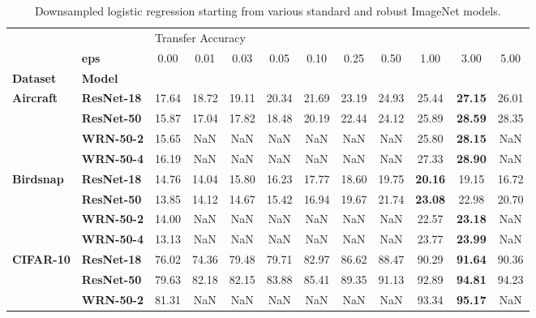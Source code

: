 \begin{table}
\centering
\caption{Downsampled logistic regression starting from various standard and robust ImageNet models.}
\label{app:downsampling-LogisticRegression}
\begin{tabular}{l|l|cccccccccc}
\toprule
       & {} & \multicolumn{10}{l}{Transfer Accuracy} \\
       & \textbf{eps} &              0.00 &  0.01 &  0.03 &  0.05 &  0.10 &  0.25 &  0.50 &  1.00 &  3.00 &  5.00 \\
\textbf{Dataset} & \textbf{Model} &                   &       &       &       &       &       &       &       &       &       \\
\midrule
\multirow{4}{*}{\textbf{Aircraft}} & \textbf{ResNet-18} &             17.64 & 18.72 & 19.11 & 20.34 & 21.69 & 23.19 & 24.93 & 25.44 & \textbf{27.15} & 26.01 \\
       & \textbf{ResNet-50} &             15.87 & 17.04 & 17.82 & 18.48 & 20.19 & 22.44 & 24.12 & 25.89 & \textbf{28.59} & 28.35 \\
       & \textbf{WRN-50-2} &             15.65 &   NaN &   NaN &   NaN &   NaN &   NaN &   NaN & 25.80 & \textbf{28.15} &   NaN \\
       & \textbf{WRN-50-4} &             16.19 &   NaN &   NaN &   NaN &   NaN &   NaN &   NaN & 27.33 & \textbf{28.90} &   NaN \\
\cline{1-12}
\multirow{4}{*}{\textbf{Birdsnap}} & \textbf{ResNet-18} &             14.76 & 14.04 & 15.80 & 16.23 & 17.77 & 18.60 & 19.75 & \textbf{20.16} & 19.15 & 16.72 \\
       & \textbf{ResNet-50} &             13.85 & 14.12 & 14.67 & 15.42 & 16.94 & 19.67 & 21.74 & \textbf{23.08} & 22.98 & 20.70 \\
       & \textbf{WRN-50-2} &             14.00 &   NaN &   NaN &   NaN &   NaN &   NaN &   NaN & 22.57 & \textbf{23.18} &   NaN \\
       & \textbf{WRN-50-4} &             13.13 &   NaN &   NaN &   NaN &   NaN &   NaN &   NaN & 23.77 & \textbf{23.99} &   NaN \\
\cline{1-12}
\multirow{4}{*}{\textbf{CIFAR-10}} & \textbf{ResNet-18} &             76.02 & 74.36 & 79.48 & 79.71 & 82.97 & 86.62 & 88.47 & 90.29 & \textbf{91.64} & 90.36 \\
       & \textbf{ResNet-50} &             79.63 & 82.18 & 82.15 & 83.88 & 85.41 & 89.35 & 91.13 & 92.89 & \textbf{94.81} & 94.23 \\
       & \textbf{WRN-50-2} &             81.31 &   NaN &   NaN &   NaN &   NaN &   NaN &   NaN & 93.34 & \textbf{95.17} &   NaN \\

\end{tabular}
\end{table}
